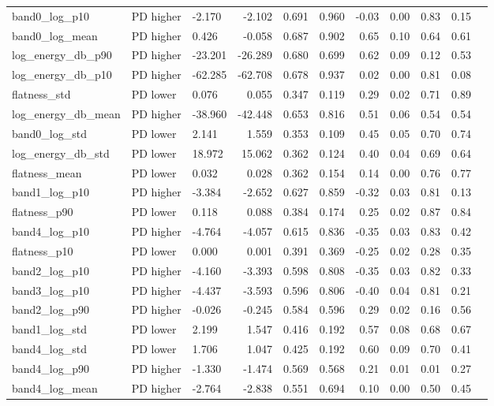\documentclass[10pt,a4paper]{article}
\begin{document}
\begin{center}
\begin{longtable}{lllrrrrrrrr}
band0\_log\_p10 & PD higher & -2.170 & -2.102 & 0.691 & 0.960 & -0.03 & 0.00 & 0.83 & 0.15\\
band0\_log\_mean & PD higher & 0.426 & -0.058 & 0.687 & 0.902 & 0.65 & 0.10 & 0.64 & 0.61\\
log\_energy\_db\_p90 & PD higher & -23.201 & -26.289 & 0.680 & 0.699 & 0.62 & 0.09 & 0.12 & 0.53\\
log\_energy\_db\_p10 & PD higher & -62.285 & -62.708 & 0.678 & 0.937 & 0.02 & 0.00 & 0.81 & 0.08\\
flatness\_std & PD lower & 0.076 & 0.055 & 0.347 & 0.119 & 0.29 & 0.02 & 0.71 & 0.89\\
log\_energy\_db\_mean & PD higher & -38.960 & -42.448 & 0.653 & 0.816 & 0.51 & 0.06 & 0.54 & 0.54\\
band0\_log\_std & PD lower & 2.141 & 1.559 & 0.353 & 0.109 & 0.45 & 0.05 & 0.70 & 0.74\\
log\_energy\_db\_std & PD lower & 18.972 & 15.062 & 0.362 & 0.124 & 0.40 & 0.04 & 0.69 & 0.64\\
flatness\_mean & PD lower & 0.032 & 0.028 & 0.362 & 0.154 & 0.14 & 0.00 & 0.76 & 0.77\\
band1\_log\_p10 & PD higher & -3.384 & -2.652 & 0.627 & 0.859 & -0.32 & 0.03 & 0.81 & 0.13\\
flatness\_p90 & PD lower & 0.118 & 0.088 & 0.384 & 0.174 & 0.25 & 0.02 & 0.87 & 0.84\\
band4\_log\_p10 & PD higher & -4.764 & -4.057 & 0.615 & 0.836 & -0.35 & 0.03 & 0.83 & 0.42\\
flatness\_p10 & PD lower & 0.000 & 0.001 & 0.391 & 0.369 & -0.25 & 0.02 & 0.28 & 0.35\\
band2\_log\_p10 & PD higher & -4.160 & -3.393 & 0.598 & 0.808 & -0.35 & 0.03 & 0.82 & 0.33\\
band3\_log\_p10 & PD higher & -4.437 & -3.593 & 0.596 & 0.806 & -0.40 & 0.04 & 0.81 & 0.21\\
band2\_log\_p90 & PD higher & -0.026 & -0.245 & 0.584 & 0.596 & 0.29 & 0.02 & 0.16 & 0.56\\
band1\_log\_std & PD lower & 2.199 & 1.547 & 0.416 & 0.192 & 0.57 & 0.08 & 0.68 & 0.67\\
band4\_log\_std & PD lower & 1.706 & 1.047 & 0.425 & 0.192 & 0.60 & 0.09 & 0.70 & 0.41\\
band4\_log\_p90 & PD higher & -1.330 & -1.474 & 0.569 & 0.568 & 0.21 & 0.01 & 0.01 & 0.27\\
band4\_log\_mean & PD higher & -2.764 & -2.838 & 0.551 & 0.694 & 0.10 & 0.00 & 0.50 & 0.45\\

\end{longtable}
\end{center}
\end{document}

